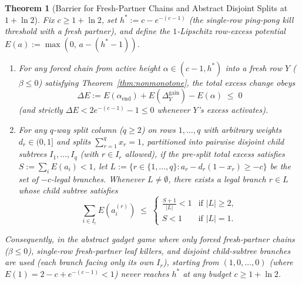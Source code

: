\documentclass[11pt]{article}
\newtheorem{theorem}{Theorem}
\theoremstyle{definition}
\newcommand{\disc}{\Delta}
\begin{document}
\begin{theorem}[Barrier for Fresh-Partner Chains and Abstract Disjoint Splits at $1+\ln 2$]\label{thm:barrier}
Fix $c\ge 1+\ln 2$, set $h^*:=c-e^{-(c-1)}$ (the single-row ping-pong kill threshold with a fresh partner), and define the $1$-Lipschitz row-excess potential $E(a):=\max(0,\, a-(h^*-1))$.
\begin{enumerate}
\item For any forced chain from active height $\alpha\in(c-1,h^*)$ into a fresh row $Y$ ($\beta\le 0$) satisfying Theorem~\ref{thm:nonmonotone}, the total excess change obeys
\[
 \Delta E := E(\alpha_{\mathrm{end}})+E(\disc_Y^{\mathrm{gain}})-E(\alpha) \;\le\; 0
\]
(and strictly $\Delta E < 2e^{-(c-1)}-1\le 0$ whenever $Y$'s excess activates).
\item For any $q$-way split column ($q\ge 2$) on rows $1,\dots,q$ with arbitrary weights $d_r\in(0,1]$ and splits $\sum_{r=1}^q x_r=1$, partitioned into pairwise disjoint child subtrees $I_1,\dots,I_q$ (with $r\in I_r$ allowed), if the pre-split total excess satisfies $S:=\sum_i E(a_i)<1$, let $L:=\{r\in\{1,\dots,q\}: a_r - d_r(1-x_r)\ge -c\}$ be the set of $-c$-legal branches. Whenever $L\ne\emptyset$, there exists a legal branch $r\in L$ whose child subtree satisfies
\[
 \sum_{i\in I_r} E\!\left(a_i^{(r)}\right) \;\le\;
 \begin{cases}
  \frac{S+1}{|L|} < 1 & \text{if } |L|\ge 2,\\
  S < 1 & \text{if } |L|=1.
 \end{cases}
\]
\end{enumerate}
Consequently, in the abstract gadget game where only forced fresh-partner chains ($\beta\le 0$), single-row fresh-partner leaf killers, and disjoint child-subtree branches are used (each branch facing only its own $I_r$), starting from $(1,0,\dots,0)$ (where $E(1)=2-c+e^{-(c-1)}<1$) never reaches $h^*$ at any budget $c\ge 1+\ln 2$.
\end{theorem}
\end{document}
